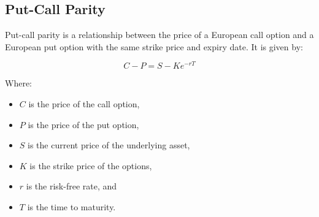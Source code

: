 \subsection*{Put-Call Parity}
Put-call parity is a relationship between the price of a European call option and a European put option with the same strike price and expiry date. It is given by:

\begin{equation}
    C - P = S - Ke^{-rT}
\end{equation}
    
    Where:
    \begin{itemize}
        \item \( C \) is the price of the call option,
        \item \( P \) is the price of the put option,
        \item \( S \) is the current price of the underlying asset,
        \item \( K \) is the strike price of the options,
        \item \( r \) is the risk-free rate, and
        \item \( T \) is the time to maturity.
    \end{itemize}   



